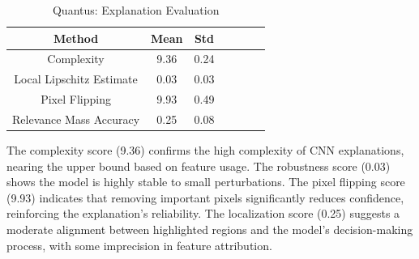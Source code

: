 \documentclass[9pt]{midl} %
\begin{document}
\begin{table}[h!]
\centering
\begin{minipage}{0.48\textwidth}

    \label{tab:quantus}
    \begin{tabular}{@{}ccccccc@{}}
    \hline
    \textbf{Method} & \textbf{Mean} & \textbf{Std} \\
    \hline
    Complexity & 9.36 & 0.24 \\
    Local Lipschitz Estimate & 0.03 & 0.03 \\
    Pixel Flipping & 9.93 & 0.49 \\
    Relevance Mass Accuracy & 0.25 & 0.08 \\
    \hline
    \end{tabular}\centering
    \caption{Quantus: Explanation Evaluation}
\end{minipage}\hfill
\begin{minipage}{0.48\textwidth}
    The complexity score (9.36) confirms the high complexity of CNN explanations, nearing the upper bound based on feature usage. The robustness score (0.03) shows the model is highly stable to small perturbations. The pixel flipping score (9.93) indicates that removing important pixels significantly reduces confidence, reinforcing the explanation’s reliability. The localization score (0.25) suggests a moderate alignment between highlighted regions and the model’s decision-making process, with some imprecision in feature attribution.
\end{minipage}
\end{table}




\end{document}
